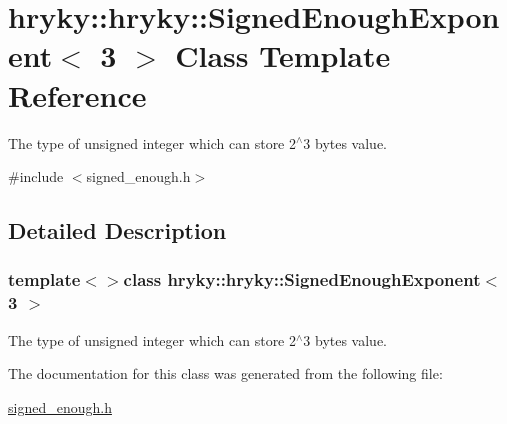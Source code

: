 \hypertarget{classhryky_1_1hryky_1_1_signed_enough_exponent_3_013_01_4}{\section{hryky\-:\-:hryky\-:\-:Signed\-Enough\-Exponent$<$ 3 $>$ Class Template Reference}
\label{classhryky_1_1hryky_1_1_signed_enough_exponent_3_013_01_4}
}


The type of unsigned integer which can store 2$^\wedge$3 bytes value.  




{\ttfamily \#include $<$signed\-\_\-enough.\-h$>$}



\subsection{Detailed Description}
\subsubsection*{template$<$$>$class hryky\-::hryky\-::\-Signed\-Enough\-Exponent$<$ 3 $>$}

The type of unsigned integer which can store 2$^\wedge$3 bytes value. 

The documentation for this class was generated from the following file\-:\begin{DoxyCompactItemize}
\item 
\hyperlink{signed__enough_8h}{signed\-\_\-enough.\-h}\end{DoxyCompactItemize}
